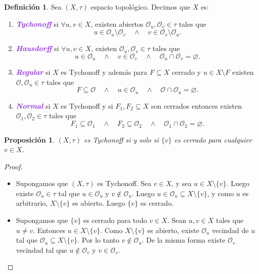 \documentclass{article}
\newtheorem{proposition}[theorem]{Proposición}
\theoremstyle{definition}
\newtheorem{definition}[theorem]{Definición}
\theoremstyle{remark}
\numberwithin{equation}{section}
\renewcommand{\O}{\mathcal{O}}
\renewcommand{\t}{\tau}
\newcommand{\wea}[1]{\textcolor{BlueViolet}{\textbf{\emph{#1}}}}
\begin{document}
\begin{definition}
  Sea $(X,\t)$ espacio topológico. Decimos que $X$ es:
  \begin{enumerate}[(1)]
    \item \wea{Tychonoff} si $\forall u,v \in X$, existen abiertos $\O_u, \O_v \in \t$ tales que
    \[u \in \O_u \setminus \O_v \quad\land\quad
    v \in \O_v \setminus \O_u.\]

    \item \wea{Hausdorff} si $\forall u,v \in X$, existen $\O_u, \O_v \in \t$ tales que
    \[u \in \O_u \quad\land\quad
    v \in \O_v \quad\land\quad
    \O_u \cap \O_v = \varnothing.\]

    \item \wea{Regular} si $X$ es Tychonoff y además para $F \subseteq X$ cerrado y $u \in X \setminus F$ existen $\O, \O_u \in \t$ tales que
    \[F \subseteq \O \quad\land\quad
    u \in \O_u \quad\land\quad
    \O \cap \O_u = \varnothing.\]

    \item \wea{Normal} si $X$ es Tychonoff y si $F_1, F_2 \subseteq X$ son cerrados entonces existen $\O_1,\O_2 \in \t$ tales que
    \[F_1 \subseteq \O_1 \quad\land\quad
    F_2 \subseteq \O_2 \quad\land\quad
    \O_1 \cap \O_2 = \varnothing.\]
  \end{enumerate}
\end{definition}

\begin{proposition}
  $(X,\t)$ es Tychonoff si y solo si $\{v\}$ es cerrado para cualquier $v \in X$.
\end{proposition}
\begin{proof}\
  \begin{itemize}
    \item \boxed{\implies} Supongamos que $(X,\t)$ es Tychonoff.
    Sea $v \in X$, y sea $u \in X \setminus \{v\}$. Luego existe $\O_u \in \t$ tal que $u \in \O_u$ y $v \notin \O_u$. Luego $u \in \O_u \subseteq X \setminus \{v\}$, y como $u$ es arbitrario, $X \setminus \{v\}$ es abierto. Luego $\{v\}$ es cerrado.

    \item \boxed{\impliedby} Supongamos que $\{v\}$ es cerrado para todo $v \in X$. Sean $u,v \in X$ tales que $u \neq v$. Entonces $u \in X \setminus \{v\}$. Como $X \setminus \{v\}$ es abierto, existe $\O_u$ vecindad de $u$ tal que $\O_u \subseteq X \setminus \{v\}$. Por lo tanto $v \notin \O_u$. De la misma forma existe $\O_v$ vecindad tal que $u \notin \O_v$ y $v \in \O_v$.
  \end{itemize}
\end{proof}
\end{document}
